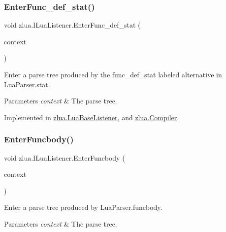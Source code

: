 \subsubsection{\texorpdfstring{Enter\+Func\+\_\+def\+\_\+stat()}{EnterFunc\_def\_stat()}}
{\footnotesize\ttfamily void zlua.\+I\+Lua\+Listener.\+Enter\+Func\+\_\+def\+\_\+stat (\begin{DoxyParamCaption}\item[{\mbox{[}\+Not\+Null\mbox{]} \mbox{\hyperlink{classzlua_1_1_lua_parser_1_1_func__def__stat_context}{Lua\+Parser.\+Func\+\_\+def\+\_\+stat\+Context}}}]{context }\end{DoxyParamCaption})}



Enter a parse tree produced by the {\ttfamily func\+\_\+def\+\_\+stat} labeled alternative in Lua\+Parser.\+stat. 


\begin{DoxyParams}{Parameters}
{\em context} & The parse tree.\\
\hline
\end{DoxyParams}


Implemented in \mbox{\hyperlink{classzlua_1_1_lua_base_listener_ae342d4559800c58b6cfc9e42d5ba2837}{zlua.\+Lua\+Base\+Listener}}, and \mbox{\hyperlink{classzlua_1_1_compiler_a2a2bdb04e6e4f416e0f6141c26981c3f}{zlua.\+Compiler}}.

\mbox{\label{interfacezlua_1_1_i_lua_listener_afb6c93f652b5230dbe2972642281f66b}} 
\subsubsection{\texorpdfstring{Enter\+Funcbody()}{EnterFuncbody()}}
{\footnotesize\ttfamily void zlua.\+I\+Lua\+Listener.\+Enter\+Funcbody (\begin{DoxyParamCaption}\item[{\mbox{[}\+Not\+Null\mbox{]} \mbox{\hyperlink{classzlua_1_1_lua_parser_1_1_funcbody_context}{Lua\+Parser.\+Funcbody\+Context}}}]{context }\end{DoxyParamCaption})}



Enter a parse tree produced by Lua\+Parser.\+funcbody. 


\begin{DoxyParams}{Parameters}
{\em context} & The parse tree.\\
\hline
\end{DoxyParams}


